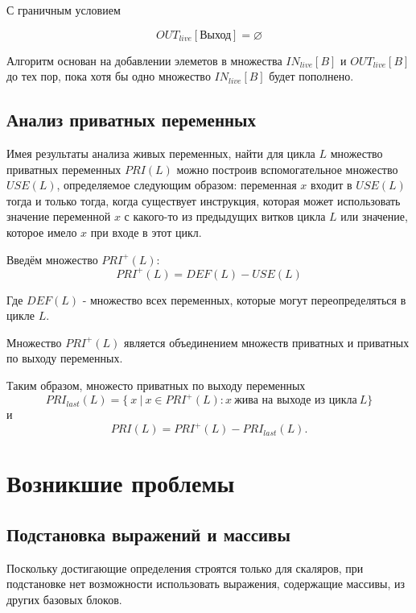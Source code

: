 \documentclass{article}
\begin{document}
С граничным условием

\begin{equation*}
    OUT_{live}[\text{Выход}] = \varnothing
\end{equation*}

Алгоритм основан на добавлении элеметов в множества $IN_{live}[B]$ и 
$OUT_{live}[B]$ до тех пор, пока хотя бы 
одно множество $IN_{live}[B]$ будет пополнено.


\subsection{Анализ приватных переменных}

Имея результаты анализа живых переменных, найти для цикла $L$ множество приватных переменных $PRI(L)$ можно построив вспомогательное множество
$USE(L)$, определяемое следующим образом: переменная $x$ входит в $USE(L)$ тогда и только тогда, когда существует инструкция, которая может использовать значение переменной $x$ с какого-то из предыдущих витков цикла $L$ или значение, которое имело $x$ при входе в  этот цикл.


Введём множество $PRI^+(L)$:
\begin{equation*}
PRI^+(L) = DEF(L) - USE(L)
\end{equation*}

Где $DEF(L)$ - множество всех переменных, которые могут переопределяться в цикле $L$.

Множество $PRI^+(L)$ является объединением множеств приватных и приватных по выходу переменных.

Таким образом, множесто приватных по выходу переменных
\begin{equation*}
PRI_{last}(L) = \{\ x\ |\ x \in PRI^+(L): x\ \text{жива на выходе из цикла}\ L\}
\end{equation*}
и
\begin{equation*}
    PRI(L) = PRI^+(L) - PRI_{last}(L).
\end{equation*}

\section{Возникшие проблемы}
\subsection*{Подстановка выражений и массивы}
    Поскольку достигающие определения строятся только для скаляров, при подстановке нет возможности использовать выражения, содержащие массивы, из других базовых блоков.
\end{document}
